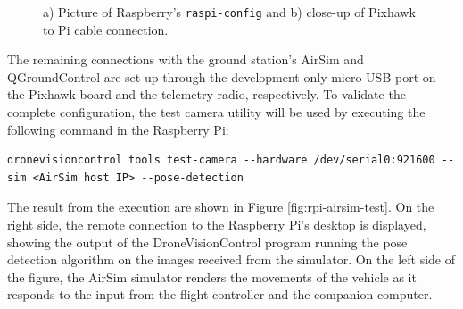 \begin{figure}
  \centering
  \caption{a) Picture of Raspberry's \texttt{raspi-config} and b) close-up of Pixhawk to Pi cable connection.}
  \label{fig:serial-connection}
\end{figure}


The remaining connections with the ground station's AirSim and QGroundControl are set up through the development-only micro-USB port on the Pixhawk board and the telemetry radio, respectively. To validate the complete configuration, the test camera utility will be used by executing the following command in the Raspberry Pi:

\begin{verbatim}
dronevisioncontrol tools test-camera --hardware /dev/serial0:921600 --sim <AirSim host IP> --pose-detection
\end{verbatim}

The result from the execution are shown in Figure \ref{fig:rpi-airsim-test}. On the right side, the remote connection to the Raspberry Pi's desktop is displayed, showing the output of the DroneVisionControl program running the pose detection algorithm on the images received from the simulator. On the left side of the figure, the AirSim simulator renders the movements of the vehicle as it responds to the input from the flight controller and the companion computer.

